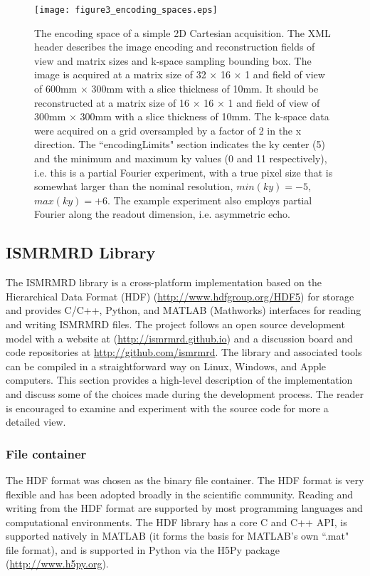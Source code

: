 \documentclass[12pt, draft]{article}
\begin{document}
\begin{figure}
\begin{center}
\texttt{[image: figure3\_encoding\_spaces.eps]}
\caption{The encoding space of a simple 2D Cartesian acquisition.  The XML header describes the image encoding and reconstruction fields of view and matrix sizes and k-space sampling bounding box.  The image is acquired at a matrix size of 32 $\times$ 16 $\times$ 1 and field of view of 600mm $\times$ 300mm with a slice thickness of 10mm.  It should be reconstructed at a matrix size of 16 $\times$ 16 $\times$ 1 and field of view of 300mm $\times$ 300mm with a slice thickness of 10mm.   The k-space data were acquired on a grid oversampled by a factor of 2 in the x direction.  The ``encodingLimits" section indicates the ky center (5) and the minimum and maximum ky values (0 and 11 respectively), i.e. this is a partial Fourier experiment, with a true pixel size that is somewhat larger than the nominal resolution, $min(ky)=-5$, $max(ky)=+6$. The example experiment also employs partial Fourier along the readout dimension, i.e. asymmetric echo.}
\label{fig:encoding}
\end{center}
\end{figure}


\subsection*{ISMRMRD Library}
The ISMRMRD library is a cross-platform implementation based on the Hierarchical Data Format (HDF) (\url{http://www.hdfgroup.org/HDF5}) for storage and provides C/C++, Python, and MATLAB (Mathworks) interfaces for reading and writing ISMRMRD files.  The project follows an open source development model with a website at (\url{http://ismrmrd.github.io}) and a discussion board and code repositories at \url{http://github.com/ismrmrd}.  The library and associated tools can be compiled in a straightforward way on Linux, Windows, and Apple computers.  This section provides a high-level description of the implementation and discuss some of the choices made during the development process.  The reader is encouraged to examine and experiment with the source code for more a detailed view.

\subsubsection*{File container}
The HDF format was chosen as the binary file container.  The HDF format is very flexible and has been adopted broadly in the scientific community.  Reading and writing from the HDF format are supported by most programming languages and computational environments.  The HDF library has a core C and C++ API, is supported natively in MATLAB (it forms the basis for MATLAB's own ``.mat" file format), and is supported in Python via the H5Py package (\url{http://www.h5py.org}).
\end{document}
